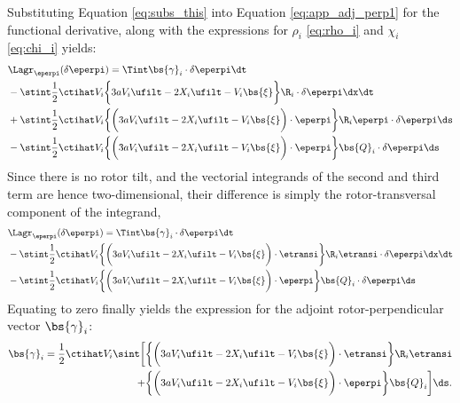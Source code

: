 \noindent Substituting Equation \eqref{eq:subs_this} into Equation \eqref{eq:app_adj_perp1} for the functional derivative, along with the expressions for $\rho_i$ \eqref{eq:rho_i} and $\chi_i$ \eqref{eq:chi_i} yields:
\begin{align}
&\Lagr_{\eperpi}(\delta \eperpi) = \Tint \bs{\gamma}_i \cdot \delta \eperpi \dt \nonumber\\
& - \stint \frac{1}{2} \ctihat V_i \bigg\{ 3a V_i \ufilt  - 2 X_i \ufilt - V_i\bs{\xi}   \bigg\} \R_i \cdot \delta \eperpi \dx \dt \nonumber \\
& + \stint \frac{1}{2} \ctihat V_i \bigg\{ \bigg(3aV_i \ufilt  -2 X_i \ufilt - V_i\bs{\xi} \bigg) \cdot \eperpi \bigg\} \R_i \eperpi \cdot \delta \eperpi \ds \nonumber \\
& - \stint \frac{1}{2} \ctihat V_i \bigg\{ \bigg(3aV_i \ufilt  -2 X_i \ufilt - V_i\bs{\xi} \bigg) \cdot \eperpi \bigg\} \bs{Q}_i \cdot \delta \eperpi \ds 
\end{align}
Since there is no rotor tilt, and the vectorial integrands of the second and third term are hence two-dimensional, their difference is simply the rotor-transversal component of the integrand, 
\begin{align}
&\Lagr_{\eperpi}(\delta \eperpi) = \Tint \bs{\gamma}_i \cdot \delta \eperpi \dt \nonumber\\
& - \stint \frac{1}{2} \ctihat V_i \bigg\{ \bigg(3a V_i \ufilt  - 2 X_i \ufilt - V_i\bs{\xi} \bigg) \cdot \etransi   \bigg\} \R_i \etransi \cdot \delta \eperpi \dx \dt \nonumber \\
& - \stint \frac{1}{2} \ctihat V_i \bigg\{ \bigg(3aV_i \ufilt  -2 X_i \ufilt - V_i\bs{\xi} \bigg) \cdot \eperpi \bigg\} \bs{Q}_i \cdot \delta \eperpi \ds 
\end{align}
Equating to zero finally yields the expression for the adjoint rotor-perpendicular vector $\bs{\gamma}_i$:
\begin{align}
\bs{\gamma}_i = \frac{1}{2} \ctihat V_i \sint \bigg[ & \bigg\{ \bigg(3a V_i \ufilt  - 2 X_i \ufilt - V_i\bs{\xi} \bigg) \cdot \etransi   \bigg\} \R_i \etransi   \nonumber\\
  + & \bigg\{ \bigg(3aV_i \ufilt  -2 X_i \ufilt - V_i\bs{\xi} \bigg) \cdot \eperpi \bigg\} \bs{Q}_i \bigg] \ds. \label{eq:app_adj_gamma_final}  
\end{align}


